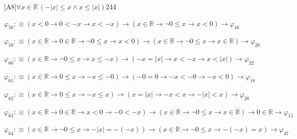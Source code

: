 \begin{fullproof}{[A8]}{$\forall x \in \mathbb{R}\,(-\lvert x \rvert \leq x \land x \leq \lvert x \rvert)$}{244}
\begin{abbrevlist}
\item $\varphi_{58} :\equiv (x < 0 \to 0 < -x \to x < -x) \to (x \in \mathbb{R} \to \neg 0 \leq x \to x < 0) \to \varphi_{16}$
\item $\varphi_{59} :\equiv (x \in \mathbb{R} \to 0 \in \mathbb{R} \to \neg 0 \leq x \to x < 0) \to (x \in \mathbb{R} \to \neg 0 \leq x \to x \in \mathbb{R}) \to \varphi_{20}$
\item $\varphi_{60} :\equiv (x \in \mathbb{R} \to \neg 0 \leq x \to x \leq -x) \to (-x = \lvert x \rvert \to x < -x \to x < \lvert x \rvert) \to \varphi_{22}$
\item $\varphi_{61} :\equiv (x \in \mathbb{R} \to 0 \leq x \to -x \leq -0) \to (-0 = 0 \to -x < -0 \to -x < 0) \to \varphi_{18}$
\item $\varphi_{62} :\equiv (x \in \mathbb{R} \to 0 \leq x \to -x \leq x) \to (x = \lvert x \rvert \to -x < x \to -\lvert x \rvert < x) \to \varphi_{28}$
\item $\varphi_{63} :\equiv (x \in \mathbb{R} \to 0 \in \mathbb{R} \to x < 0 \to -0 < -x) \to (x \in \mathbb{R} \to \neg 0 \leq x \to x \in \mathbb{R}) \to 0 \in \mathbb{R} \to \varphi_{15}$
\item $\varphi_{64} :\equiv (x \in \mathbb{R} \to \neg 0 \leq x \to -\lvert x \rvert = -(-x)) \to (x \in \mathbb{R} \to \neg 0 \leq x \to -(-x) = x) \to \varphi_{47}$
\end{abbrevlist}
\end{fullproof}
